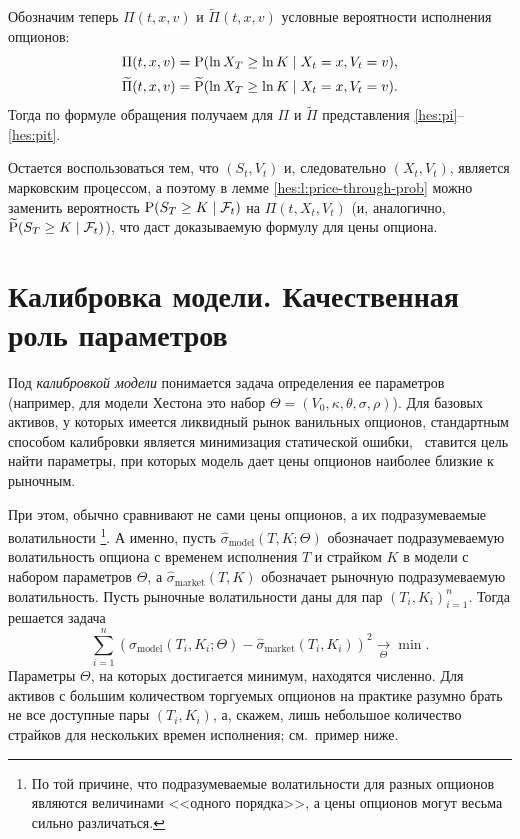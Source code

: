 Обозначим теперь $\Pi(t,x,v)$ и $\tilde\Pi(t,x,v)$ условные вероятности исполнения опционов:
\begin{align*}
&\Pi(t,x,v) = \P(\ln X_T \ge \ln K \mid X_t =x , V_t=v), \\
&\tilde \Pi(t,x,v) = \tilde \P(\ln X_T \ge \ln K \mid X_t =x , V_t=v).
\end{align*}
Тогда по формуле обращения получаем для $\Pi$ и $\tilde\Pi$ представления \eqref{hes:pi}--\eqref{hes:pit}.

Остается воспользоваться тем, что $(S_t,V_t)$ и, следовательно $(X_t,V_t)$, является марковским процессом, а поэтому в лемме \eqref{hes:l:price-through-prob} можно заменить вероятность $\P(S_T\ge K\mid \F_t)$ на $\Pi(t, X_t, V_t)$ (и, аналогично, $\tilde \P(S_T\ge K\mid \F_t)$), что даст доказываемую формулу для цены опциона.


\section{Калибровка модели. Качественная роль параметров}

Под \emph{калибровкой модели} понимается задача определения ее параметров (например, для модели Хестона это набор $\Theta=(V_0,\kappa,\theta,\sigma,\rho)$).
Для базовых активов, у которых имеется ликвидный рынок ванильных опционов, стандартным способом калибровки является минимизация статической ошибки, \te\ ставится цель найти параметры, при которых модель дает цены опционов наиболее близкие к рыночным.

При этом, обычно сравнивают не сами цены опционов, а их подразумеваемые волатильности%
\footnote{По той причине, что подразумеваемые волатильности для разных опционов являются величинами <<одного порядка>>, а цены опционов могут весьма сильно различаться.}.
А именно, пусть $\hat\sigma_\text{model}(T,K; \Theta)$ обозначает подразумеваемую волатильность опциона с временем исполнения $T$ и страйком $K$ в модели с набором параметров $\Theta$, а $\hat\sigma_\text{market}(T,K)$ обозначает рыночную подразумеваемую волатильность.
Пусть рыночные волатильности даны для пар $(T_i,K_i)_{i=1}^n$.
Тогда решается задача 
\begin{equation}
\label{hes:calibration}
\sum_{i=1}^n (\hat\sigma_\text{model}(T_i,K_i;\Theta) - \hat\sigma_\text{market}(T_i,K_i))^2 \xrightarrow[\Theta]{} \min.
\end{equation}
Параметры $\Theta$, на которых достигается минимум, находятся численно. 
Для активов с большим количеством торгуемых опционов на практике разумно брать не все доступные пары $(T_i,K_i)$, а, скажем, лишь небольшое количество страйков для нескольких времен исполнения; см.~пример ниже.

